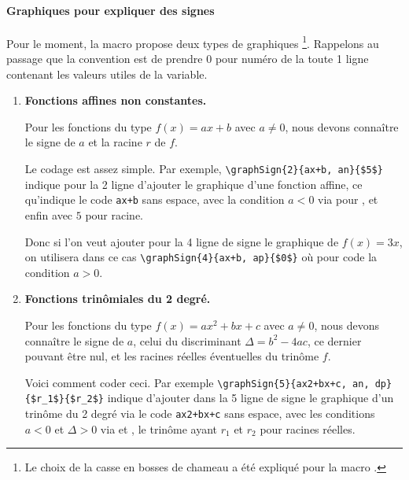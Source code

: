 \documentclass[12pt,a4paper]{article}
\begin{document}


\paragraph{Graphiques pour expliquer des signes}

Pour le moment, la macro  propose deux types de graphiques
\footnote{
    Le choix de la casse en bosses de chameau a été expliqué pour la macro .
}.
Rappelons au passage que la convention est de prendre $0$ pour numéro de la toute 1\iere{} ligne contenant les valeurs utiles de la variable.

\begin{enumerate}
    \item \textbf{Fonctions affines non constantes.}
          
          \smallskip

          Pour les fonctions du type $f(x) = a x + b$ avec $a \neq 0$, nous devons connaître le signe de $a$ et la racine $r$ de $f$.
          
          \smallskip

          Le codage est assez simple.
          Par exemple, \verb#\graphSign{2}{ax+b, an}{$5$}# indique pour la 2\ieme{} ligne d'ajouter le graphique d'une fonction affine, ce qu'indique le code \verb#ax+b# sans espace, avec la condition $a < 0$ via  pour , et enfin avec $5$ pour racine.
          
          \smallskip

          Donc si l'on veut ajouter pour la 4\ieme{} ligne de signe le graphique de $f(x) = 3x$, on utilisera dans ce cas \verb#\graphSign{4}{ax+b, ap}{$0$}# où  pour  code la condition $a > 0$.




    \medskip
    \item \textbf{Fonctions trinômiales du 2\ieme{} degré.}
          
          \smallskip

          Pour les fonctions du type $f(x) = a x^2 + b x + c$ avec $a \neq 0$, nous devons connaître le signe de $a$, celui du discriminant $\Delta = b^2 - 4ac$, ce dernier pouvant être nul, et les racines réelles éventuelles du trinôme $f$.

          \smallskip

          Voici comment coder ceci.
          Par exemple \verb#\graphSign{5}{ax2+bx+c, an, dp}{$r_1$}{$r_2$}# indique d'ajouter dans la 5\ieme{} ligne de signe le graphique d'un trinôme du 2\ieme{} degré via le code \verb#ax2+bx+c# sans espace, avec les conditions $a < 0$ et $\Delta > 0$ via  et , le trinôme ayant $r_1$ et $r_2$ pour racines réelles.


\end{enumerate}
\end{document}
